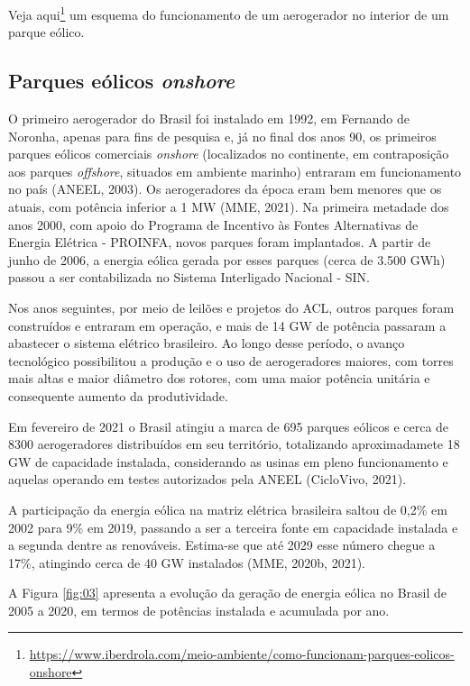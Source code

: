 \documentclass[
  oneside]{scrbook}
\DeclareRobustCommand{\href}[2]{#2\footnote{\url{#1}}}
\begin{document}
\href{https://www.iberdrola.com/meio-ambiente/como-funcionam-parques-eolicos-onshore}{Veja aqui} um esquema do funcionamento de um aerogerador no interior de um parque eólico.

\hypertarget{parques-euxf3licos-onshore}{%
\subsection{\texorpdfstring{Parques eólicos \emph{onshore}}{Parques eólicos onshore}}\label{parques-euxf3licos-onshore}}

O primeiro aerogerador do Brasil foi instalado em 1992, em Fernando de Noronha, apenas para fins de pesquisa e, já no final dos anos 90, os primeiros parques eólicos comerciais \emph{onshore} (localizados no continente, em contraposição aos parques \emph{offshore}, situados em ambiente marinho) entraram em funcionamento no país (ANEEL, 2003). Os aerogeradores da época eram bem menores que os atuais, com potência inferior a 1 MW (MME, 2021). Na primeira metadade dos anos 2000, com apoio do Programa de Incentivo às Fontes Alternativas de Energia Elétrica - PROINFA, novos parques foram implantados. A partir de junho de 2006, a energia eólica gerada por esses parques (cerca de 3.500 GWh) passou a ser contabilizada no Sistema Interligado Nacional - SIN.

Nos anos seguintes, por meio de leilões e projetos do ACL, outros parques foram construídos e entraram em operação, e mais de 14 GW de potência passaram a abastecer o sistema elétrico brasileiro. Ao longo desse período, o avanço tecnológico possibilitou a produção e o uso de aerogeradores maiores, com torres mais altas e maior diâmetro dos rotores, com uma maior potência unitária e consequente aumento da produtividade.

Em fevereiro de 2021 o Brasil atingiu a marca de 695 parques eólicos e cerca de 8300 aerogeradores distribuídos em seu território, totalizando aproximadamete 18 GW de capacidade instalada, considerando as usinas em pleno funcionamento e aquelas operando em testes autorizados pela ANEEL (CicloVivo, 2021).

A participação da energia eólica na matriz elétrica brasileira saltou de 0,2\% em 2002 para 9\% em 2019, passando a ser a terceira fonte em capacidade instalada e a segunda dentre as renováveis. Estima-se que até 2029 esse número chegue a 17\%, atingindo cerca de 40 GW instalados (MME, 2020b, 2021).

A Figura \ref{fig:03} apresenta a evolução da geração de energia eólica no Brasil de 2005 a 2020, em termos de potências instalada e acumulada por ano.
\end{document}
